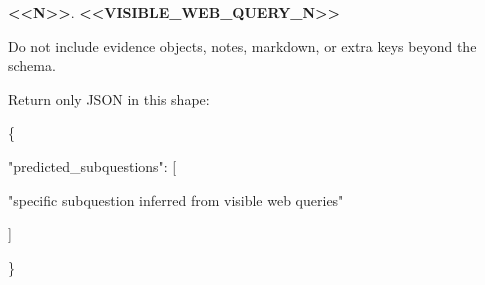 \begin{tcolorbox}
\begin{scriptsize}
\textcolor{my-green}{\textbf{\textless{}\textless{}N\textgreater{}\textgreater{}}}. \textcolor{my-green}{\textbf{\textless{}\textless{}VISIBLE\_WEB\_QUERY\_N\textgreater{}\textgreater{}}}\par
\mbox{}\par
Do not include evidence objects, notes, markdown, or extra keys beyond the schema.\par
Return only JSON in this shape:\par
\{\par
  "predicted\_subquestions": [\par
    "specific subquestion inferred from visible web queries"\par
  ]\par
\}\par
\end{scriptsize}
\end{tcolorbox}


